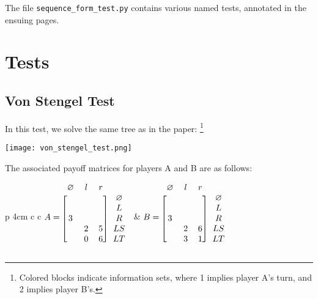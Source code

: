 \documentclass[11pt]{tufte-handout}
\theoremstyle{plain}
\theoremstyle{definition}
\theoremstyle{remark}
\begin{document}
 The file \verb|sequence_form_test.py| contains various named tests, annotated in the ensuing pages.

\newpage
\setcounter{section}{1}
\section{Tests}
\subsection{Von Stengel Test}
In this test, we solve the same tree as in the paper:
    \footnote{Colored blocks indicate information sets, where 1 implies player A's turn, and 2 implies player B's.} 
\\[6pt]
\begin{center}
    \texttt{[image: von\_stengel\_test.png]}
\end{center}
The associated payoff matrices for players A and B are as follows:\\[6pt]
\begin{tabular}{p {4cm} c c}
     {$\displaystyle
        A = \begin{blockarray}{c c c c}
            \varnothing & l & r \\
            \begin{block}{[c c c] c}
                &   &   & \varnothing \\
                &   &   & L \\
              3 &   &   & R \\
                & 2 & 5 & LS \\
                & 0 & 6 & LT \\
            \end{block}
            \end{blockarray}$} &
        {$B = \begin{blockarray}{c c c c}
                \varnothing & l & r \\
                \begin{block}{[c c c] c}
                    &   &   & \varnothing \\
                    &   &   & L \\
                  3 &   &   & R \\
                    & 2 & 6 & LS \\
                    & 3 & 1 & LT \\
                \end{block}
                \end{blockarray}
    $}
\end{tabular}
\end{document}
